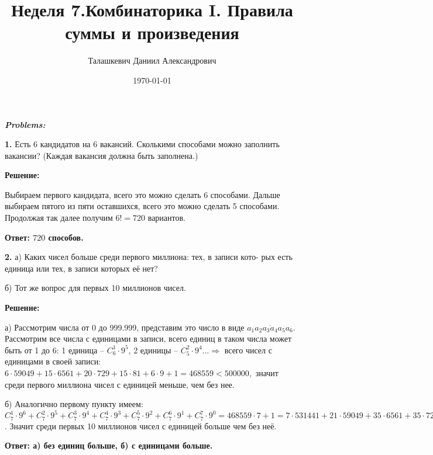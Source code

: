 \documentclass[a4paper,12pt]{article} %
\author{Талашкевич Даниил Александрович}
\title{Неделя 7.Комбинаторика I. Правила суммы и произведения}
\date{\today}
\begin{document}
\maketitle
\thispagestyle{empty}

\newpage
\setcounter{page}{1}
\begin{center}
\itshape
\bfseries
{ \Large Problems:}
\end{center}

{\bf 1.} Есть 6 кандидатов на 6 вакансий. Сколькими способами можно
заполнить вакансии? (Каждая вакансия должна быть заполнена.)
\begin{center}
\bfseries
{\Large Решение: }
\end{center}

Выбираем первого кандидата, всего это можно сделать 6 способами. Дальше выбираем пятого из пяти оставшихся, всего это можно сделать 5 способами. Продолжая так далее получим $6! = 720$ вариантов.

\begin{flushright}
\begin{large}
\textbf {Ответ: $720$ способов.}
\end{large}
\end{flushright}

{\bf 2.} а) Каких чисел больше среди первого миллиона: тех, в записи кото-
рых есть единица или тех, в записи которых её нет?

б) Тот же вопрос для первых 10 миллионов чисел.
\begin{center}
\bfseries
{\Large Решение: }
\end{center}

а) Рассмотрим числа от 0 до 999.999, представим это число в виде $\overline{a_1a_2a_3a_4a_5a_6}$. Рассмотрим все числа с единицами в записи, всего единиц в таком числа может быть от 1 до 6: 1 единица -- $C^1_6\cdot 9^5$, 2 единицы -- $C^2_5\cdot 9^4 \dots \Rightarrow $ всего чисел с единицами в своей записи: $6\cdot 59049 + 15\cdot 6561 + 20\cdot 729 + 15\cdot 81 + 6\cdot 9 + 1 = 468559 < 500000,$ значит среди первого миллиона чисел с единицей меньше, чем без нее.

б) Аналогично первому пункту имеем: $C^1_7\cdot 9^6 + C^2_7\cdot 9^5  + C^3_7\cdot 9^4 + C^4_7\cdot 9^3 + C^5_7\cdot 9^2 + C^6_7\cdot 9^1 + C^7_7\cdot 9^0= 468559 · 7 + 1 =
7 \cdot 531441 + 21 \cdot 59049 + 35 \cdot 6561 + 35 \cdot 729 + 21 \cdot 81 + 7 \cdot 9 + 1 = 5217031$. Значит среди первых 10 миллионов чисел с единицей больше чем без неё.

\begin{flushright}
\begin{large}
\textbf {Ответ: а) без единиц больше, б) с единицами больше.}
\end{large}
\end{flushright}
\end{document}
